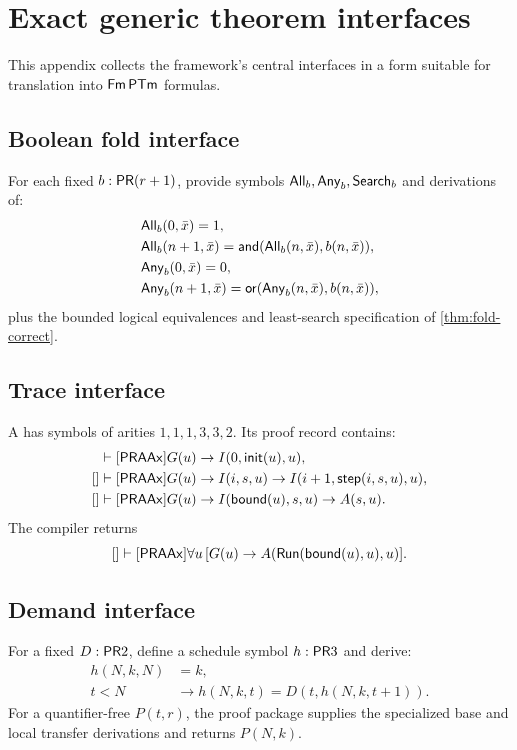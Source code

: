 \appendix
\section{Exact generic theorem interfaces}
\label{app:interfaces}

This appendix collects the framework's central interfaces in a form suitable
for translation into \(\mathsf{Fm}\,\mathsf{PTm}\) formulas.

\subsection{Boolean fold interface}

For each fixed \(b:\mathsf{PR}(r+1)\), provide symbols
\(\mathsf{All}_b,\mathsf{Any}_b,\mathsf{Search}_b\) and derivations of:
\begin{align*}
&\mathsf{All}_b(0,\bar x)=1,\\
&\mathsf{All}_b(n+1,\bar x)=\mathsf{and}(\mathsf{All}_b(n,\bar x),b(n,\bar x)),\\
&\mathsf{Any}_b(0,\bar x)=0,\\
&\mathsf{Any}_b(n+1,\bar x)=\mathsf{or}(\mathsf{Any}_b(n,\bar x),b(n,\bar x)),
\end{align*}
plus the bounded logical equivalences and least-search specification of
\cref{thm:fold-correct}.

\subsection{Trace interface}

A  has symbols of arities \(1,1,1,3,3,2\).  Its proof
record contains:
\begin{align*}
[]&\vdash[\PRAAx]G(u)\to I(0,\mathsf{init}(u),u),\\
[]&\vdash[\PRAAx]G(u)\to I(i,s,u)\to
 I(i+1,\mathsf{step}(i,s,u),u),\\
[]&\vdash[\PRAAx]G(u)\to I(\mathsf{bound}(u),s,u)\to A(s,u).
\end{align*}
The compiler returns
\[
 []\vdash[\mathsf{PRAAx}]\forall u\,[G(u)\to
 A(\mathsf{Run}(\mathsf{bound}(u),u),u)].
\]

\subsection{Demand interface}

For a fixed \(D:\mathsf{PR} 2\), define a schedule symbol \(h:\mathsf{PR} 3\) and derive:
\begin{align*}
 h(N,k,N)&=k,\\
 t<N&\to h(N,k,t)=D(t,h(N,k,t+1)).
\end{align*}
For a quantifier-free \(P(t,r)\), the proof package supplies the specialized
base and local transfer derivations and returns \(P(N,k)\).

